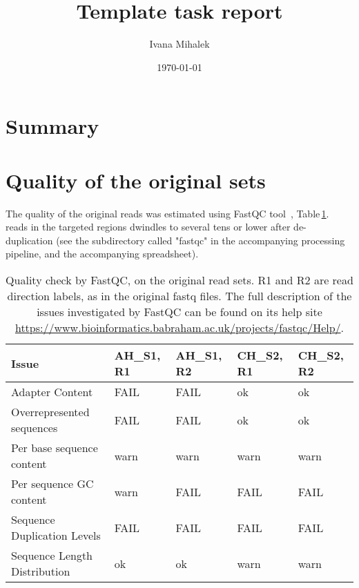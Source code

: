 \documentclass[fleqn]{scrartcl}%
\title{Template task report}%
\author{Ivana Mihalek}%
\date{\today}%
\begin{document}
\normalsize%
\maketitle%
\section*{Summary}

\vspace{0.5in}

\clearpage


\section{Quality of the original sets}

The quality of the original reads was estimated using FastQC tool~\cite{fastqc}, Table\,\ref{table:before}.
reads in the targeted regions dwindles to several tens or lower after de-duplication (see the subdirectory called
"fastqc" in the accompanying processing pipeline, and the  accompanying spreadsheet).


\begin{table}[ht]
	\begin{tabular}{ |l||l |l |l |l |  }
		\hline
		Issue & AH\_S1, R1  & AH\_S1, R2   & CH\_S2, R1  & CH\_S2, R2 \\
		\hline
		Adapter Content & FAIL  & FAIL  & ok  & ok \\
		Overrepresented sequences & FAIL  & FAIL  & ok  & ok \\
		Per base sequence content & warn  & warn  & warn  & warn \\
		Per sequence GC content & warn  & FAIL  & FAIL  & FAIL \\
		Sequence Duplication Levels & FAIL  & FAIL  & FAIL  & FAIL \\
		Sequence Length Distribution & ok  & ok  & warn  & warn \\
		\hline
	\end{tabular}
	\caption{Quality check by FastQC,  on the original read sets. R1 and R2 are read direction labels, as in
	the original fastq files. The full description of the issues investigated by FastQC can be found
	 on its help site  \url{https://www.bioinformatics.babraham.ac.uk/projects/fastqc/Help/}.}
	\label{table:before}
\end{table}
\end{document}
